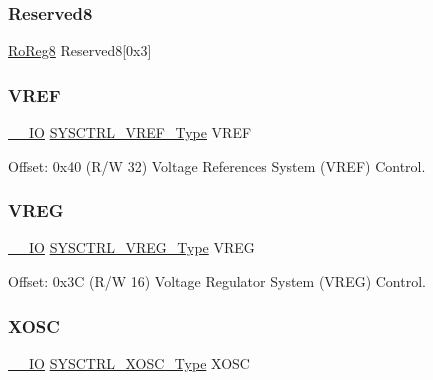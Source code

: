 \subsubsection{\texorpdfstring{Reserved8}{Reserved8}}
{\footnotesize\ttfamily \mbox{\hyperlink{group___s_a_m_d21_e15_a__definitions_ga0d957f1433aaf5d70e4dc2b68288442d}{Ro\+Reg8}} Reserved8\mbox{[}0x3\mbox{]}}

\mbox{\label{struct_sysctrl_a19869edd9d8d89257a60e585a700e028}} 
\subsubsection{\texorpdfstring{VREF}{VREF}}
{\footnotesize\ttfamily \mbox{\hyperlink{core__cm0plus_8h_aec43007d9998a0a0e01faede4133d6be}{\+\_\+\+\_\+\+IO}} \mbox{\hyperlink{union_s_y_s_c_t_r_l___v_r_e_f___type}{S\+Y\+S\+C\+T\+R\+L\+\_\+\+V\+R\+E\+F\+\_\+\+Type}} V\+R\+EF}



Offset\+: 0x40 (R/W 32) Voltage References System (V\+R\+EF) Control. 

\mbox{\label{struct_sysctrl_a0197791e83fea741592ef43e5c22e528}} 
\subsubsection{\texorpdfstring{VREG}{VREG}}
{\footnotesize\ttfamily \mbox{\hyperlink{core__cm0plus_8h_aec43007d9998a0a0e01faede4133d6be}{\+\_\+\+\_\+\+IO}} \mbox{\hyperlink{union_s_y_s_c_t_r_l___v_r_e_g___type}{S\+Y\+S\+C\+T\+R\+L\+\_\+\+V\+R\+E\+G\+\_\+\+Type}} V\+R\+EG}



Offset\+: 0x3C (R/W 16) Voltage Regulator System (V\+R\+EG) Control. 

\mbox{\label{struct_sysctrl_a704fdb07aa59f53bdff5052e95442f47}} 
\subsubsection{\texorpdfstring{XOSC}{XOSC}}
{\footnotesize\ttfamily \mbox{\hyperlink{core__cm0plus_8h_aec43007d9998a0a0e01faede4133d6be}{\+\_\+\+\_\+\+IO}} \mbox{\hyperlink{union_s_y_s_c_t_r_l___x_o_s_c___type}{S\+Y\+S\+C\+T\+R\+L\+\_\+\+X\+O\+S\+C\+\_\+\+Type}} X\+O\+SC}



